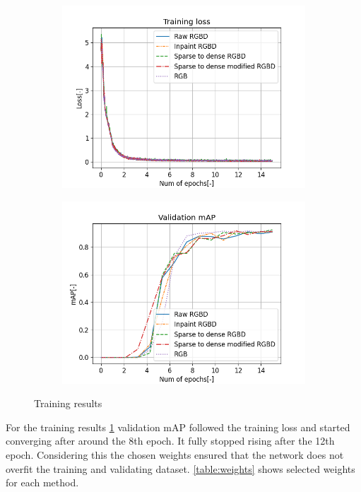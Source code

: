 \documentclass[twoside]{ctuthesis}
\theoremstyle{plain}
\theoremstyle{definition}
\theoremstyle{note}
\begin{document}
\begin{figure}
	\centering
	\begin{subfigure}[b]{0.49\textwidth}
		\centering
		\includegraphics[width=\textwidth]{train_loss.png}
	\end{subfigure}
	\hfill
	\begin{subfigure}[b]{0.49\textwidth}
		\centering
		\includegraphics[width=\textwidth]{validation_mAP.png}
	\end{subfigure}
	\caption{Training results}
	\label{fig:yolo_res}
\end{figure}
For the training results \ref{fig:yolo_res} validation mAP followed the training loss and started converging after around the 8th epoch. It fully stopped rising after the 12th epoch. Considering this the chosen weights ensured that the network does not overfit the training and validating dataset. \autoref{table:weights} shows selected weights for each method.
\end{document}
